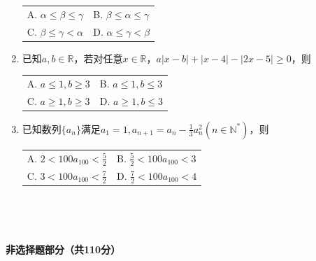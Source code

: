 \documentclass[UTF8]{ctexart}
\newcommand{\tmstrong}[1]{\textbf{#1}}
\begin{document}
\begin{enumerate}
  {\noindent}\begin{tabularx}{1.0\textwidth}{@{}X@{}@{}X@{}}
    A. $\alpha \leqslant \beta \leqslant \gamma$ & B. $\beta \leqslant \alpha
    \leqslant \gamma$\\
    C. $\beta \leqslant \gamma < \alpha$ & D. $\alpha \leqslant \gamma <
    \beta$
  \end{tabularx}
  
  {}
  
  \item 已知$a, b \in \mathbb{R}$，若对任意$x \in \mathbb{R}$，$a | x
  - b | + | x - 4 | - | 2 x - 5 | \geqslant 0$，则
  
  {\noindent}\begin{tabularx}{1.0\textwidth}{@{}X@{}@{}X@{}}
    A. $a \leqslant 1, b \geqslant 3$ & B. $a \leqslant 1, b \leqslant 3$\\
    C. $a \geqslant 1, b \geqslant 3$ & D. $a \geqslant 1, b \leqslant 3$
  \end{tabularx}
  
  \item 已知数列$\{ a_n \}$满足$a_1 = 1, a_{n + 1} = a_n - \frac{1}{3}
  a_n^2 (n \in \mathbb{N}^{\ast})$，则
  
  {\noindent}\begin{tabularx}{1.0\textwidth}{@{}X@{}@{}X@{}}
    A. $2 < 100 a_{100} < \frac{5}{2}$ & B. $\frac{5}{2} < 100 a_{100} < 3$\\
    C. $3 < 100 a_{100} < \frac{7}{2}$ & D. $\frac{7}{2} < 100 a_{100} < 4$
  \end{tabularx}
\end{enumerate}


\

\

\begin{center}
  {\tmstrong{非选择题部分（共110分）}}
\end{center}

\
\end{document}
